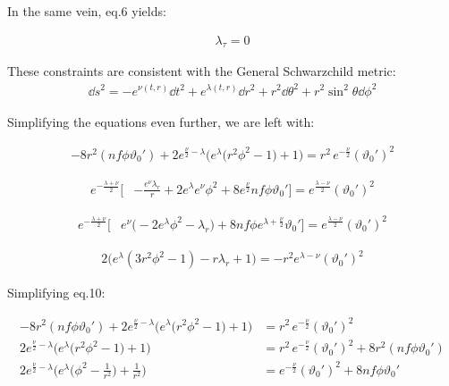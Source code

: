 \documentclass[12pt]{article}
\begin{document}
In the same vein, eq.6 yields:

\begin{align}
  \lambda_\tau = 0
\end{align}

These constraints are consistent with the General Schwarzchild metric:
\begin{align*}
  \dd{s^2} = -e^{\nu(t,r)}\dd{t^2} + e^{\lambda(t,r)}\dd{r^2} + r^2\dd{\theta^2} + r^2\sin^2{\theta}\dd{\phi^2}
\end{align*}

Simplifying the equations even further, we are left with:

\begin{align}
-8r^2 \left(nf\phi\vartheta_0' \right)
+2e^{\frac{\nu}{2} - \lambda}
\Big( e^{\lambda} \big(r^2\phi^2 - 1 \big) + 1\Big)
= r^2 \, e^{-\frac{\nu}{2}}(\vartheta_0')^2
\end{align}

\begin{align}
e^{-\frac{\lambda + \nu}{2}} \Big[
 &- \frac{e^{\nu}\lambda_r}{r} + 2 e^{\lambda} e^{\nu} \phi^2
 + 8 e^{\frac{\nu}{2}} nf\phi\vartheta_0'
\Big] = e^\frac{\lambda - \nu}{2} (\vartheta_0')^2
\end{align}

\begin{align}
e^{-\frac{\lambda + \nu}{2}} \Big[
 & e^{\nu} \Big(
     - 2e^{\lambda}\phi^2 - \lambda_r
   \Big) + 8 nf \phi e^{\lambda + \frac{\nu}{2}} \vartheta_0'
\Big] = e^\frac{\lambda - \nu}{2}(\vartheta_0')^2
\end{align}

\begin{align}
2 
\Big(
  e^{\lambda}(3r^2\phi^2 - 1) - r\lambda_r + 1
\Big)
= - r^2 
e^{\lambda-\nu} (\vartheta_0')^2
\end{align}

Simplifying eq.10:

\begin{align*}
  -8r^2 \left(nf\phi\vartheta_0' \right) +2e^{\frac{\nu}{2} - \lambda} \Big( e^{\lambda} \big(r^2\phi^2 - 1 \big) + 1\Big) &= r^2 \, e^{-\frac{\nu}{2}}(\vartheta_0')^2 \\
  2e^{\frac{\nu}{2} - \lambda} \Big( e^{\lambda} \big(r^2\phi^2 - 1 \big) + 1\Big) &= r^2 \, e^{-\frac{\nu}{2}}(\vartheta_0')^2 + 8r^2 \left(nf\phi\vartheta_0' \right) \\
  2e^{\frac{\nu}{2} - \lambda} \Big( e^{\lambda} \big(\phi^2 - \frac{1}{r^2} \big) + \frac{1}{r^2}\Big) &= e^{-\frac{\nu}{2}}(\vartheta_0')^2 + 8 nf\phi\vartheta_0'
\end{align*}
\end{document}
